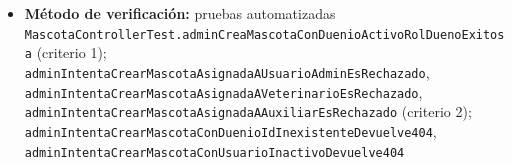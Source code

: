 \documentclass[
  spanish,
]{article}
\providecommand{\tightlist}{%
  \setlength{\itemsep}{0pt}\setlength{\parskip}{0pt}}
\begin{document}
\begin{itemize}
  \begin{enumerate}
  \def\labelenumi{\arabic{enumi}.}
  \tightlist
  \item
    Dado un usuario \texttt{ROLE\_\allowbreak{}ADMIN} y un dueño activo con rol
    \texttt{ROLE\_\allowbreak{}DUENO}, cuando envía \texttt{POST\ /\allowbreak{}api/\allowbreak{}mascotas} con
    datos válidos, entonces la respuesta es \texttt{201\ Created} con la
    mascota creada y \texttt{activo\ =\ true}.
  \item
    Dado un \texttt{duenio\allowbreak{}Id} que corresponde a un usuario cuyo rol
    \textbf{no} es \texttt{ROLE\_\allowbreak{}DUENO} (ADMIN, VETERINARIO o AUXILIAR),
    entonces la solicitud es rechazada con \texttt{400\ Bad\ Request} y
    \texttt{Problem\allowbreak{}Detail}.
  \item
    Dado un \texttt{duenio\allowbreak{}Id} inexistente o correspondiente a un usuario
    inactivo, entonces la respuesta es \texttt{404} con
    \texttt{Problem\allowbreak{}Detail}.
  \item
    Dado un usuario con rol \texttt{ROLE\_\allowbreak{}DUENO}, cuando intenta crear
    una mascota, entonces la respuesta es \texttt{403}.
  \item
    Dado un cuerpo con campos obligatorios ausentes o inválidos,
    entonces la respuesta es \texttt{422} con \texttt{Problem\allowbreak{}Detail} de
    validación.
  \end{enumerate}
\item
  \textbf{Método de verificación:} pruebas automatizadas
  \texttt{Mascota\allowbreak{}Controller\allowbreak{}Test.\allowbreak{}admin\allowbreak{}Crea\allowbreak{}Mascota\allowbreak{}Con\allowbreak{}Duenio\allowbreak{}Activo\allowbreak{}Rol\allowbreak{}Dueno\allowbreak{}Exitosa}
  (criterio 1);
  \texttt{admin\allowbreak{}Intenta\allowbreak{}Crear\allowbreak{}Mascota\allowbreak{}Asignada\allowbreak{}AUsuario\allowbreak{}Admin\allowbreak{}Es\allowbreak{}Rechazado},
  \texttt{admin\allowbreak{}Intenta\allowbreak{}Crear\allowbreak{}Mascota\allowbreak{}Asignada\allowbreak{}AVeterinario\allowbreak{}Es\allowbreak{}Rechazado},
  \texttt{admin\allowbreak{}Intenta\allowbreak{}Crear\allowbreak{}Mascota\allowbreak{}Asignada\allowbreak{}AAuxiliar\allowbreak{}Es\allowbreak{}Rechazado}
  (criterio 2);
  \texttt{admin\allowbreak{}Intenta\allowbreak{}Crear\allowbreak{}Mascota\allowbreak{}Con\allowbreak{}Duenio\allowbreak{}Id\allowbreak{}Inexistente\allowbreak{}Devuelve404},
  \texttt{admin\allowbreak{}Intenta\allowbreak{}Crear\allowbreak{}Mascota\allowbreak{}Con\allowbreak{}Usuario\allowbreak{}Inactivo\allowbreak{}Devuelve404}

\end{itemize}
\end{document}
